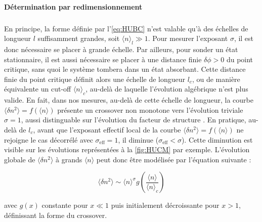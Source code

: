 \paragraph{Détermination par redimensionnement}

\subparagraph{}En principe, la forme définie par l'\autoref{eq:HUBC} n'est valable qu'à des échelles de longueur $l$ suffisamment grandes, soit $\langle n \rangle_l \gg 1$. Pour mesurer l'exposant $\sigma$, il est donc nécessaire se placer à grande échelle. Par ailleurs, pour sonder un état stationnaire, il est aussi nécessaire se placer à une distance finie $\delta\phi>0$ du point critique, sans quoi le système tombera dans un état absorbant. Cette distance finie du point critique définit alors une échelle de longueur $l_c$, ou de manière équivalente un cut-off $\langle n \rangle_c$, au-delà de laquelle l'évolution algébrique n'est plus valide. En fait, dans nos mesures, au-delà de cette échelle de longueur, la courbe $\langle \delta n^2 \rangle = f(\langle n \rangle)$ présente un crossover non monotone vers l'évolution triviale $\sigma = 1$, aussi distinguable sur l'évolution du facteur de structure \cite{hexner_hyperuniformity_2015,hexner_noise_2017, hexner_enhanced_2017 }. En pratique, au-delà de $l_c$, avant que l'exposant effectif local de la courbe $\langle \delta n^2 \rangle = f(\langle n \rangle)$ ne rejoigne le cas décorrélé avec $\sigma_\text{eff}=1$, il diminue ($\sigma_\text{eff}<\sigma$). Cette diminution est visible sur les évolutions représentées à la \autoref{fig:HUCM} par exemple. L'évolution globale de $\langle \delta n^2 \rangle$ à grands $\langle n \rangle$ peut donc être modélisée par l'équation suivante :

\begin{equation}
	\langle \delta n^2 \rangle \sim \langle n \rangle^\sigma g\left( \frac{\langle n \rangle}{\langle n \rangle_c} \right)
\end{equation}

\noindent avec $g(x)$ constante pour $x\ll 1$ puis initialement décroissante pour $x>1$, définissant la forme du crossover.

